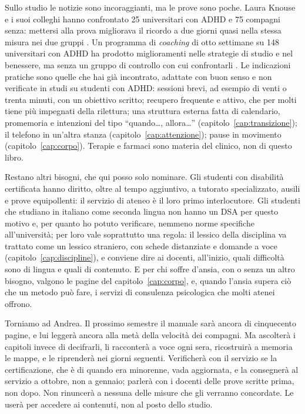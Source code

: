 Sullo studio le notizie sono incoraggianti, ma le prove sono poche. Laura Knouse e i suoi colleghi hanno confrontato 25
universitari con ADHD e 75 compagni senza: mettersi alla prova
migliorava il ricordo a due giorni quasi nella stessa misura nei due
gruppi \parencite{knouse2016}. Un programma di \emph{coaching} di otto
settimane su 148 universitari con ADHD ha prodotto miglioramenti nelle
strategie di studio e nel benessere, ma senza un gruppo di controllo
con cui confrontarli \parencite{prevatt2015}. Le indicazioni pratiche sono quelle che hai già incontrato, adattate con buon senso e non verificate in studi su studenti con ADHD: sessioni brevi, ad esempio di venti o trenta minuti, con un obiettivo scritto; recupero frequente e attivo, che per molti tiene più impegnati della rilettura; una struttura
esterna fatta di calendario, promemoria e intenzioni del tipo
\enquote{quando\dots, allora\dots} (capitolo~\ref{cap:transizione});
il telefono in un'altra stanza (capitolo~\ref{cap:attenzione}); pause
in movimento (capitolo~\ref{cap:corpo}). Terapie e farmaci sono
materia del clinico, non di questo libro.

Restano altri bisogni, che qui posso solo nominare. Gli studenti con
disabilità certificata hanno diritto, oltre al tempo aggiuntivo, a
tutorato specializzato, ausili e prove equipollenti: il servizio di
ateneo è il loro primo interlocutore. Gli studenti che studiano in
italiano come seconda lingua non hanno un DSA per questo motivo e, per quanto ho potuto verificare, nemmeno norme specifiche all'università; per loro vale soprattutto
una regola: il lessico della disciplina va trattato come un lessico
straniero, con schede distanziate e domande a voce
(capitolo~\ref{cap:discipline}), e conviene dire ai docenti, all'inizio,
quali difficoltà sono di lingua e quali di contenuto. E per chi soffre
d'ansia, con o senza un altro bisogno, valgono le pagine del
capitolo~\ref{cap:corpo}, e, quando l'ansia supera ciò che un metodo
può fare, i servizi di consulenza psicologica che molti atenei offrono.

\asterismo

Torniamo ad Andrea. Il prossimo semestre il manuale sarà ancora di
cinquecento pagine, e lui leggerà ancora alla metà della velocità dei
compagni. Ma ascolterà i capitoli invece di decifrarli, li racconterà
a voce ogni sera, ricostruirà a memoria le mappe, e le riprenderà nei
giorni seguenti. Verificherà con il servizio se la certificazione, che è di quando era minorenne, vada aggiornata, e la consegnerà al servizio a ottobre, non a gennaio; parlerà con i docenti delle prove scritte prima, non
dopo. Non rinuncerà a nessuna delle misure che gli verranno concordate. Le userà per accedere ai contenuti, non al posto dello studio.

